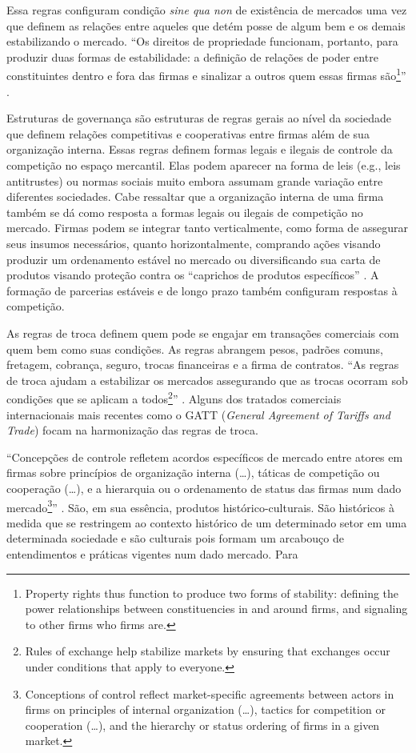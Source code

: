 \documentclass[a4paper, 12pt, openright, oneside, german, french, english, brazil]{abntex2}
\begin{document}
	Essa regras configuram condição \textit{sine qua non} de existência de mercados uma vez que definem as relações entre aqueles que detém posse de algum bem e os demais estabilizando o mercado. ``Os direitos de propriedade funcionam, portanto, para produzir duas formas de estabilidade: a definição de relações de poder entre constituintes dentro e fora das firmas e sinalizar a outros quem essas firmas são\footnote{Property rights thus function to produce two forms of stability: defining the power relationships between constituencies in and around firms, and signaling to other firms who firms are.}'' \cite[p. 34]{fligstein2002architecture}.

	Estruturas de governança são estruturas de regras gerais ao nível da sociedade que definem relações competitivas e cooperativas entre firmas além de sua organização interna. Essas regras definem formas legais e ilegais de controle da competição no espaço mercantil. Elas podem aparecer na forma de leis (e.g., leis antitrustes) ou normas sociais muito embora assumam grande variação entre diferentes sociedades. Cabe ressaltar que a organização interna de uma firma também se dá como resposta a formas legais ou ilegais de competição no mercado. Firmas podem se integrar tanto verticalmente, como forma de assegurar seus insumos necessários, quanto horizontalmente, comprando ações visando produzir um ordenamento estável no mercado ou diversificando sua carta de produtos visando proteção contra os ``caprichos de produtos específicos'' \cite[p. 34]{fligstein2002architecture}. A formação de parcerias estáveis e de longo prazo também configuram respostas à competição.

	As regras de troca definem quem pode se engajar em transações comerciais com quem bem como suas condições. As regras abrangem pesos, padrões comuns, fretagem, cobrança, seguro, trocas financeiras e a firma de contratos. ``As regras de troca ajudam a estabilizar os mercados assegurando que as trocas ocorram sob condições que se aplicam a todos\footnote{Rules of exchange help stabilize markets by ensuring that exchanges occur under conditions that apply to everyone.}'' \cite[p. 35]{fligstein2002architecture}. Alguns dos tratados comerciais internacionais mais recentes como o GATT (\textit{General Agreement of Tariffs and Trade}) focam na harmonização das regras de troca.

	``Concepções de controle refletem acordos específicos de mercado entre atores em firmas sobre princípios de organização interna (\dots), táticas de competição ou cooperação (\dots), e a hierarquia ou o ordenamento de status das firmas num dado mercado\footnote{Conceptions of control reflect market-specific agreements between actors in firms on principles of internal organization (\dots), tactics for competition or cooperation (\dots), and the hierarchy or status ordering of firms in a given market.}'' \cite[p. 35]{fligstein2002architecture}. São, em sua essência, produtos histórico-culturais. São históricos à medida que se restringem ao contexto histórico de um determinado setor em uma determinada sociedade e são culturais pois formam um arcabouço de entendimentos e práticas vigentes num dado mercado. Para 
\end{document}
